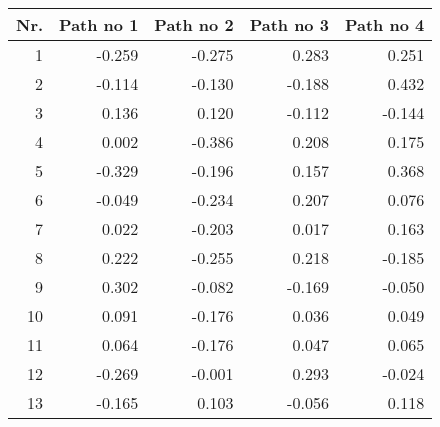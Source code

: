 \begin{tabular}{|r|r|r|r|r|}
  \hline
  \textbf{Nr.}&  \textbf{Path no 1}&  \textbf{Path no 2}&  \textbf{Path no 3}&  \textbf{Path no 4}\\
  \hline
  1& -0.259& -0.275& 0.283& 0.251\\
  \hline
  2& -0.114& -0.130& -0.188& 0.432\\
  \hline
  3& 0.136& 0.120& -0.112& -0.144\\
  \hline
  4& 0.002& -0.386& 0.208& 0.175\\
  \hline
  5& -0.329& -0.196& 0.157& 0.368\\
  \hline
  6& -0.049& -0.234& 0.207& 0.076\\
  \hline
  7& 0.022& -0.203& 0.017& 0.163\\
  \hline
  8& 0.222& -0.255& 0.218& -0.185\\
  \hline
  9& 0.302& -0.082& -0.169& -0.050\\
  \hline
  10& 0.091& -0.176& 0.036& 0.049\\
  \hline
  11& 0.064& -0.176& 0.047& 0.065\\
  \hline
  12& -0.269& -0.001& 0.293& -0.024\\
  \hline
  13& -0.165& 0.103& -0.056& 0.118\\
  \hline
\end{tabular}

